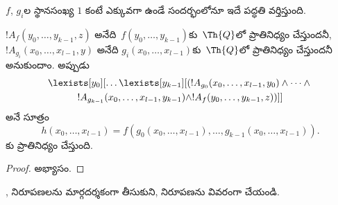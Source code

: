 \documentclass[../../../include/open-logic-section]{subfiles}
\begin{document}
$f$, $g_i$ల స్థానసంఖ్య $1$ కంటే ఎక్కువగా ఉండే సందర్భంలోనూ ఇదే పద్ధతి వర్తిస్తుంది.

\begin{prop}
$!A_f(y_0,\dots,y_{k-1},z)$ అనేది~$f(y_0,\dots,y_{k-1})$కు~$\Th{Q}$లో
ప్రాతినిధ్యం చేస్తుందనీ, $!A_{g_i}(x_0,\dots,x_{l-1},y)$ అనేది
$g_i(x_0,\dots,x_{l-1})$కు~$\Th{Q}$లో ప్రాతినిధ్యం చేస్తుందనీ అనుకుందాం.
అప్పుడు
\begin{multline*}
  \lexists[y_0][\dots\lexists[y_{k-1}][(!A_{g_0}(x_0,\dots,x_{l-1},y_0) \land
      \dots \land {}\\
  !A_{g_{k-1}}(x_0,\dots,x_{l-1},y_{k-1}) \land
  !A_f(y_0,\dots,y_{k-1},z))]]
\end{multline*}
అనే సూత్రం
\[
h(x_0, \dots, x_{l-1}) = f(g_0(x_0, \dots, x_{l-1}), \dots, g_{k-1}(x_0,
\dots, x_{l-1})).
\]
కు ప్రాతినిధ్యం చేస్తుంది.
\end{prop}

\begin{proof}
అభ్యాసం.
\end{proof}

\begin{prob}
,
 నిరూపణలను మార్గదర్శకంగా తీసుకుని,
 నిరూపణను వివరంగా చేయండి.
\end{prob}
\end{document}
